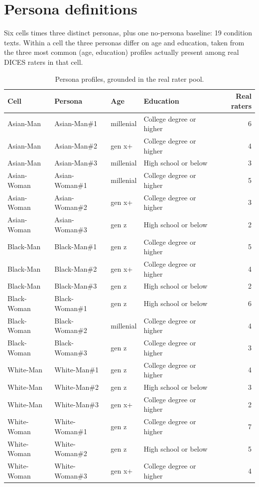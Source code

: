 \section{Persona definitions}
Six cells times three distinct personas, plus one no-persona baseline: 19 condition texts. Within a cell the three personas differ on age and education, taken from the three most common (age, education) profiles actually present among real DICES raters in that cell.

\begin{table}[htbp]\centering
\caption{Persona profiles, grounded in the real rater pool.}
\small\begin{tabular}{llllr}\toprule
\textbf{Cell} & \textbf{Persona} & \textbf{Age} & \textbf{Education} & \textbf{Real raters} \\ \midrule
Asian-Man & Asian-Man\#1 & millenial & College degree or higher & 6 \\
Asian-Man & Asian-Man\#2 & gen x+ & College degree or higher & 4 \\
Asian-Man & Asian-Man\#3 & millenial & High school or below & 3 \\
Asian-Woman & Asian-Woman\#1 & millenial & College degree or higher & 5 \\
Asian-Woman & Asian-Woman\#2 & gen x+ & College degree or higher & 3 \\
Asian-Woman & Asian-Woman\#3 & gen z & High school or below & 2 \\
Black-Man & Black-Man\#1 & gen z & College degree or higher & 5 \\
Black-Man & Black-Man\#2 & gen x+ & College degree or higher & 4 \\
Black-Man & Black-Man\#3 & gen z & High school or below & 2 \\
Black-Woman & Black-Woman\#1 & gen z & High school or below & 6 \\
Black-Woman & Black-Woman\#2 & millenial & College degree or higher & 4 \\
Black-Woman & Black-Woman\#3 & gen z & College degree or higher & 3 \\
White-Man & White-Man\#1 & gen z & College degree or higher & 4 \\
White-Man & White-Man\#2 & gen z & High school or below & 3 \\
White-Man & White-Man\#3 & gen x+ & College degree or higher & 2 \\
White-Woman & White-Woman\#1 & gen z & College degree or higher & 7 \\
White-Woman & White-Woman\#2 & gen z & High school or below & 5 \\
White-Woman & White-Woman\#3 & gen x+ & College degree or higher & 4 \\
\bottomrule\end{tabular}\end{table}

